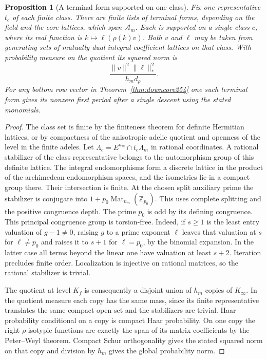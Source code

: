 \documentclass[a4paper,11pt]{article}
\newtheorem{proposition}{Proposition}[section]
\theoremstyle{definition}
\theoremstyle{remark}
\newcommand{\ZZ}{\mathbb Z}\newcommand{\ord}{\operatorname{ord}}
\numberwithin{equation}{section}
\begin{document}
\begin{proposition}[A terminal form supported on one class]\leavevmode
\label{prop:terminalcore255}
Fix one representative \(t_c\) of each finite class. There are
finite lists of terminal forms, depending on the field and the
core lattices, which span \(\mathcal A_m\). Each is supported on
a single class \(c\), where its real function is
\(k\mapsto\ell(\rho(k)v)\). Both \(v\) and \(\ell\) may be taken
from generating sets of mutually dual integral coefficient
lattices on that class. With probability measure on the
quotient its squared norm is
\[
      \frac{\|v\|^2\|\ell\|_*^2}{h_m d_\rho}.
\]
For any bottom row vector in Theorem~\ref{thm:downcore254}
one such terminal form gives its nonzero first period after a
single descent using the stated monomials.
\end{proposition}
\begin{proof}
The class set is finite by the finiteness theorem for definite
Hermitian lattices, or by compactness of the anisotropic
adelic quotient and openness of the level in the finite adeles.
Let \(\Lambda_c=E^{n_m}\cap t_c\widehat\Lambda_m\) in rational
coordinates. A rational stabilizer of the class representative
belongs to the automorphism group of this definite lattice.
The integral endomorphisms form a discrete lattice in the product
of the archimedean endomorphism spaces, and the isometries lie in
a compact group there. Their intersection is finite. At the
chosen split auxiliary prime the stabilizer is conjugate into
\(1+p_0\operatorname{Mat}_{n_m}(\ZZ_{p_0})\). This uses complete
splitting and the positive congruence depth. The prime \(p_0\)
is odd by its defining congruence. This principal congruence
group is torsion-free. Indeed, if \(s\ge1\) is the least entry
valuation of \(g-1\ne0\), raising \(g\) to a prime
exponent \(\ell\) leaves that valuation
at \(s\) for \(\ell\ne p_0\) and raises it to \(s+1\) for
\(\ell=p_0\), by the binomial expansion. In the latter case all
terms beyond the linear one have valuation at least \(s+2\).
Iteration precludes finite order. Localization is injective on
rational matrices, so the rational stabilizer is trivial.

The quotient at level \(K_f\) is consequently a disjoint union
of \(h_m\) copies of \(K_\infty\). In the quotient measure
each copy has the same mass, since its finite representative
translates the same compact open set and the stabilizers are
trivial. Haar probability conditional on a copy is compact Haar
probability. On one copy the right \(\rho\)-isotypic functions
are exactly the span of its matrix coefficients by the
Peter--Weyl theorem. Compact Schur orthogonality gives the
stated squared norm on that copy and division by \(h_m\)
gives the global probability norm.


\end{proof}
\end{document}
